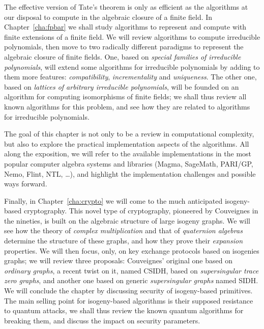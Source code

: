 \documentclass{report}
\theoremstyle{plain}
\theoremstyle{definition}
\begin{document}
The effective version of Tate's theorem is only as efficient as the
algorithms at our disposal to compute in the algebraic closure of a
finite field. %
In Chapter~\ref{cha:fpbar} we shall study algorithms to represent and
compute with finite extensions of a finite field. %
We will review algorithms to compute irreducible polynomials, then
move to two radically different paradigms to represent the algebraic
closure of finite fields. %
One, based on \emph{special families of irreducible polynomials}, will
extend some algorithms for irreducible polynomials by adding to them
more features: \emph{compatibility}, \emph{incrementality} and
\emph{uniqueness}. %
The other one, based on \emph{lattices of arbitrary irreducible
  polynomials}, will be founded on an algorithm for computing
isomorphisms of finite fields; we shall thus review all known
algorithms for this problem, and see how they are related to
algorithms for irreducible polynomials. %

The goal of this chapter is not only to be a review in computational
complexity, but also to explore the practical implementation aspects
of the algorithms. %
All along the exposition, we will refer to the available
implementations in the most popular computer algebra systems and
libraries (Magma, SageMath, PARI/GP, Nemo, Flint, NTL, \dots), and
highlight the implementation challenges and possible ways forward. %

Finally, in Chapter~\ref{cha:crypto} we will come to the much
anticipated isogeny-based cryptography. %
This novel type of cryptography, pioneered by Couveignes in the
nineties, is built on the algebraic structure of large isogeny
graphs. %
We will see how the theory of \emph{complex multiplication} and that
of \emph{quaternion algebras} determine the structure of these graphs,
and how they prove their \emph{expansion} properties. %
We will then focus, only, on key exchange protocols based on isogenies
graphs; we will review three proposals: Couveignes' original one based
on \emph{ordinary graphs}, a recent twist on it, named CSIDH, based on
\emph{supersingular trace zero graphs}, and another one based on
generic \emph{supersingular graphs} named SIDH. %
We will conclude the chapter by discussing security of isogeny-based
primitives. %
The main selling point for isogeny-based algorithms is their supposed
resistance to quantum attacks, we shall thus review the known quantum
algorithms for breaking them, and discuss the impact on security
parameters. %
\end{document}
